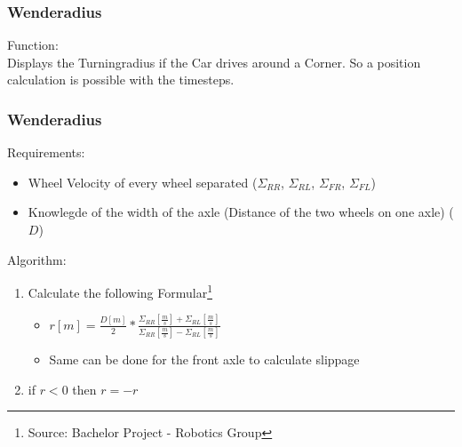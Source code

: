 \documentclass{beamer}
\begin{document}
\begin{frame}
    \frametitle{Wenderadius}
    Function:\\
    Displays the Turningradius if the Car drives around a Corner. So a position calculation is possible with the timesteps.
\end{frame}
\begin{frame}
    \frametitle{Wenderadius}
    Requirements:
    \begin{itemize}
     \item Wheel Velocity of every wheel separated ($\Sigma_{RR}$, $\Sigma_{RL}$, $\Sigma_{FR}$, $\Sigma_{FL}$)
     \item Knowlegde of the width of the axle (Distance of the two wheels on one axle) ($D$)
    \end{itemize}
    Algorithm:
    \begin{enumerate}
     \item Calculate the following Formular\footnote{Source: Bachelor Project - Robotics Group}
     \begin{itemize}
        \item $r\left[ m \right]=\frac{D\left[ m \right]}{2}*\frac{\Sigma_{RR}\left[ \frac{m}{s} \right]+\Sigma_{RL}\left[ \frac{m}{s} \right]}{\Sigma_{RR}\left[ \frac{m}{s} \right]-\Sigma_{RL}\left[ \frac{m}{s} \right]}$
        \item Same can be done for the front axle to calculate slippage
     \end{itemize}
     \item if $r<0$ then $r=-r$
    \end{enumerate}
\end{frame}
\end{document}
